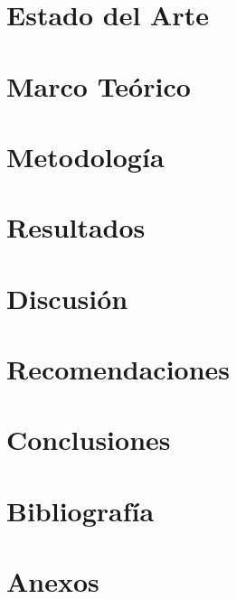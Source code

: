 \documentclass[12pt,letterpaper]{article}
\begin{document}
	\section{Estado del Arte}
	
	
	\clearpage
	\section{Marco Teórico}
	
	
	\clearpage
	\section{Metodología}
	
	
	\clearpage
	\section{Resultados}
	
	
	\clearpage
	\section{Discusión}
	
	
	\clearpage
	\section{Recomendaciones}
	
	
	\clearpage
	\section{Conclusiones}
	
	
	\clearpage
	\section*{Bibliografía}
	\printbibliography[heading=none] %
	
	\appendix
	\clearpage
	\section{Anexos}
	
	
\end{document}
